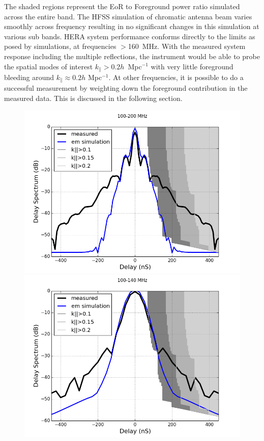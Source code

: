 \documentclass[twocolumn]{emulateapj}
\begin{document}
    The shaded regions represent the EoR to Foreground power ratio simulated across the entire band.
    The HFSS simulation of chromatic antenna beam varies smoothly across frequency resulting in no significant changes in this simulation at various sub bands.  
     HERA system performance conforms directly to the limits as posed by simulations, at frequencies $>$160~MHz. With the measured system response including the multiple reflections, the instrument would be able to probe the spatial modes of interest $k_{\parallel}>0.2 h$~Mpc$^{-1}$ with very little foreground bleeding around $k_{\parallel} \approx 0.2 h$ Mpc$^{-1}$.
      At other frequencies, it is possible to do a successful measurement by weighting down the
      foreground contribution in the measured data. This is discussed in the following section.
    \begin{figure}[ht]
    \begin{minipage}[b]{0.5\linewidth}
    \centering
    \includegraphics[angle=0, width=\linewidth]{GB_reflectometry_part3/plot/100_200.png}
    \end{minipage}
    \hspace{0.1cm}
    \begin{minipage}[b]{0.5\linewidth}
    \centering
    \includegraphics[angle=0, width=\linewidth]{GB_reflectometry_part3/plot/100_140.png}

\end{minipage}
\end{figure}
\end{document}

